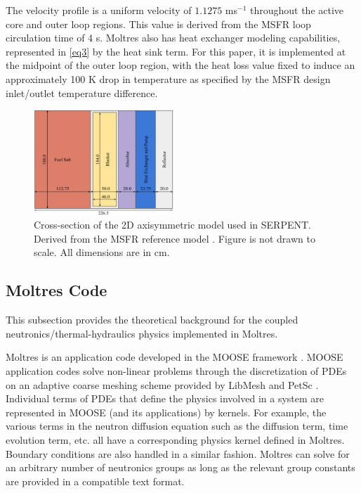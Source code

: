 \documentclass{anstrans}
\begin{document}
	The velocity profile is a uniform velocity of $1.1275$ ms$^{-1}$ throughout
	the active core and outer loop regions. This value is derived from the
	\gls{MSFR} loop circulation time of 4 s. Moltres also has heat exchanger
	modeling capabilities, represented in \ref{eq3} by the heat sink term. For
	this paper, it is implemented at the midpoint of
	the outer loop region, with the heat loss value fixed to induce an
	approximately 100 K
	drop in temperature as specified by the \gls{MSFR} design inlet/outlet
	temperature difference.
	
\begin{figure}[t] 
	\centering
	\includegraphics[width=0.47\textwidth]{./figures/reference}
	\captionsetup{justification=centering}
	\caption{Cross-section of the 2D axisymmetric model used in SERPENT.
	Derived from the \gls{MSFR} reference model
	\cite{pettersen_coupled_2016}. Figure is not drawn to scale. All dimensions
	are in cm.}
	\label{fig:reference}
\end{figure} 

\subsection{Moltres Code}

	This subsection provides the theoretical background for the coupled
	neutronics/thermal-hydraulics physics implemented in Moltres.
	
	Moltres is an application code developed in the \gls{MOOSE} framework
	\cite{gaston_moose:_2009}. \gls{MOOSE} application codes solve non-linear
	problems through the discretization of \glspl{PDE} on an adaptive coarse
	meshing scheme provided by LibMesh \cite{kirk_libmesh:_2006} and PetSc
	\cite{satish_balay_petsc_2015}. Individual terms of \glspl{PDE} that define
	the physics involved in a system are represented in \gls{MOOSE} (and its
	applications) by kernels. For example, the various terms in the neutron
	diffusion equation such as the diffusion term, time evolution term, etc.
	all have a corresponding physics kernel defined in Moltres. Boundary
	conditions are also handled in a similar fashion. Moltres can solve for an
	arbitrary number of neutronics groups as long as the relevant group
	constants are provided in a compatible text format.
\end{document}
